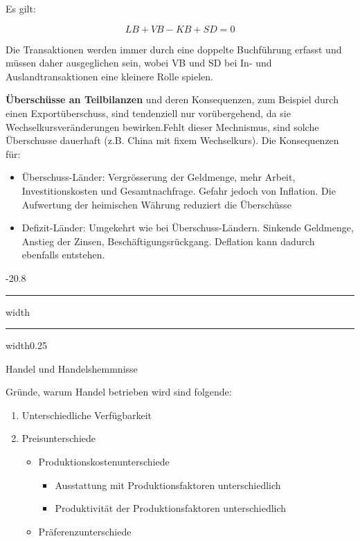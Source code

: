 \documentclass[9pt, landscape, fleqn]{scrartcl}
\makeatletter
\renewcommand{\subsection}{\@startsection{subsection}{1}{0mm}%
{-2\baselineskip}{0.8\baselineskip}%
{\hrule depth 0.2pt width\columnwidth\hrule depth0.75pt
width0.25\columnwidth\vspace*{1.2em}\large\bfseries\rmfamily}}
\makeatother
\begin{document}
\begin{multicols*}{3}
Es gilt: 

\begin{equation}
    LB + VB - KB + SD = 0
\end{equation}

Die Transaktionen werden immer durch eine doppelte Buchführung erfasst und müssen daher ausgeglichen sein, wobei VB und SD bei In- und Auslandtransaktionen eine kleinere Rolle spielen. \newline 

\textbf{Überschüsse an Teilbilanzen} und deren Konsequenzen, zum Beispiel durch einen Exportüberschuss, sind tendenziell nur vorübergehend, da sie Wechselkursveränderungen bewirken.Fehlt dieser Mechnismus, sind solche Überschusse dauerhaft (z.B. China mit fixem Wechselkurs). Die Konsequenzen für:

\begin{itemize}
    \item Überschuss-Länder: Vergrösserung der Geldmenge, mehr Arbeit, Investitionskosten und Gesamtnachfrage. Gefahr jedoch von Inflation. Die Aufwertung der heimischen Währung reduziert die Überschüsse
    \item Defizit-Länder: Umgekehrt wie bei Überschuss-Ländern. Sinkende Geldmenge, Anstieg der Zinsen, Beschäftigungsrückgang. Deflation kann dadurch ebenfalls entstehen. 
\end{itemize}

\subsection{Handel und Handelshemmnisse}

Gründe, warum Handel betrieben wird sind folgende:

\begin{enumerate}
    \item Unterschiedliche Verfügbarkeit 
    \item Preisunterschiede
    \begin{itemize}
        \item Produktionskostenunterschiede 
        \begin{itemize}
            \item Ausstattung mit Produktionsfaktoren unterschiedlich 
            \item Produktivität der Produktionsfaktoren unterschiedlich 
        \end{itemize}
        \item Präferenzunterschiede 
    \end{itemize}
\end{enumerate}


\end{multicols*}
\end{document}
